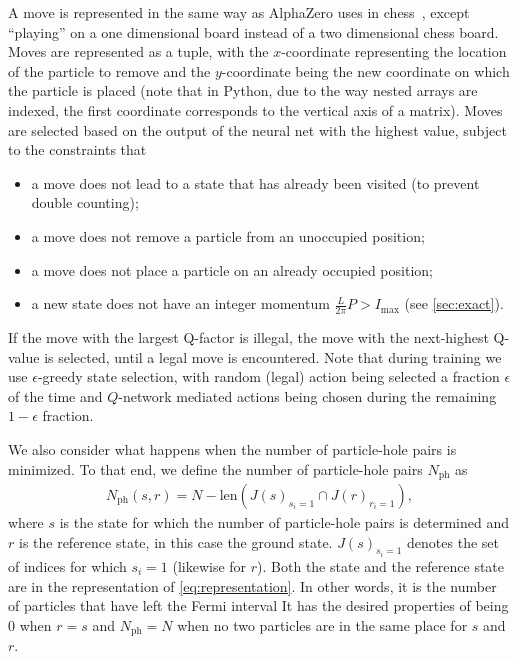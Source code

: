 \documentclass[11pt, a4paper]{report} %
\begin{document}
A move is represented in the same way as AlphaZero uses in chess~\cite{Silver2017}, except ``playing'' on a one dimensional board instead of a two dimensional chess board.
Moves are represented as a tuple, with the \(x\)-coordinate representing the location of the particle to remove and the \(y\)-coordinate being the new coordinate on which the particle is placed (note that in Python, due to the way nested arrays are indexed, the first coordinate corresponds to the vertical axis of a matrix).
Moves are selected based on the output of the neural net with the highest value, subject to the constraints that
\begin{itemize}
\item a move does not lead to a state that has already been visited (to prevent double counting);
\item a move does not remove a particle from an unoccupied position;
\item a move does not place a particle on an already occupied position;
\item a new state does not have an integer momentum \(\frac{L}{2\pi}P > I_{\max}\) (see \cref{sec:exact}).
\end{itemize}
If the move with the largest Q-factor is illegal, the move with the next-highest Q-value is selected, until a legal move is encountered.
Note that during training we use \(\epsilon\)-greedy state selection, with random (legal) action being selected a fraction \(\epsilon\) of the time and \(Q\)-network mediated actions being chosen during the remaining \(1-\epsilon\) fraction.

We also consider what happens when the number of particle-hole pairs is minimized.
To that end, we define the number of particle-hole pairs \(N_{\mathrm{ph}}\) as
\begin{align}
  \label{eq:52}
  N_{\mathrm{ph}}(s, r) = N - \mathrm{len}(J(s)_{s_i=1}\cap J(r)_{r_i=1}), 
\end{align}
where \(s\) is the state for which the number of particle-hole pairs is determined and \(r\) is the reference state, in this case the ground state.
\(J(s)_{s_i=1}\) denotes the set of indices for which \(s_i = 1\) (likewise for \(r\)).
Both the state and the reference state are in the representation of \cref{eq:representation}.
In other words, it is the number of particles that have left the Fermi interval
It has the desired properties of being 0 when \(r=s\) and \(N_{\mathrm{ph}} = N\) when no two particles are in the same place for \(s\) and \(r\).
\end{document}
